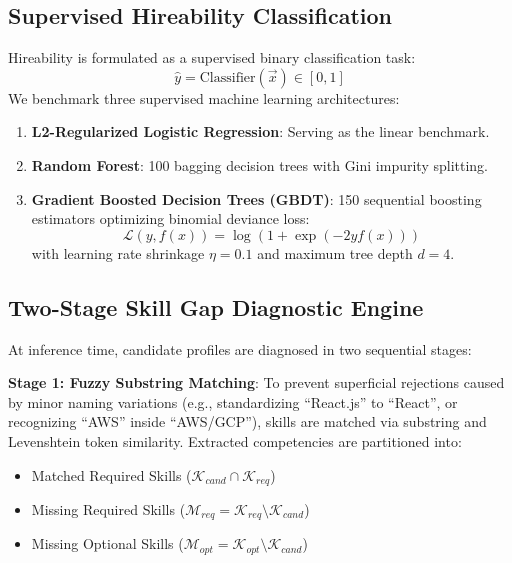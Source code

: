 \documentclass[conference]{IEEEtran}
\begin{document}
\subsection{Supervised Hireability Classification}
Hireability is formulated as a supervised binary classification task:
\begin{equation}
\hat{y} = \text{Classifier}(\vec{x}) \in [0, 1]
\end{equation}
We benchmark three supervised machine learning architectures:
\begin{enumerate}
    \item \textbf{L2-Regularized Logistic Regression}: Serving as the linear benchmark.
    \item \textbf{Random Forest}: 100 bagging decision trees with Gini impurity splitting.
    \item \textbf{Gradient Boosted Decision Trees (GBDT)}: 150 sequential boosting estimators optimizing binomial deviance loss:
    \begin{equation}
    \mathcal{L}(y, f(x)) = \log(1 + \exp(-2y f(x)))
    \end{equation}
    with learning rate shrinkage $\eta = 0.1$ and maximum tree depth $d = 4$.
\end{enumerate}

\subsection{Two-Stage Skill Gap Diagnostic Engine}
At inference time, candidate profiles are diagnosed in two sequential stages:

\textbf{Stage 1: Fuzzy Substring Matching}: To prevent superficial rejections caused by minor naming variations (e.g., standardizing ``React.js'' to ``React'', or recognizing ``AWS'' inside ``AWS/GCP''), skills are matched via substring and Levenshtein token similarity. Extracted competencies are partitioned into:
\begin{itemize}
    \item Matched Required Skills ($\mathcal{K}_{cand} \cap \mathcal{K}_{req}$)
    \item Missing Required Skills ($\mathcal{M}_{req} = \mathcal{K}_{req} \setminus \mathcal{K}_{cand}$)
    \item Missing Optional Skills ($\mathcal{M}_{opt} = \mathcal{K}_{opt} \setminus \mathcal{K}_{cand}$)
\end{itemize}
\end{document}
